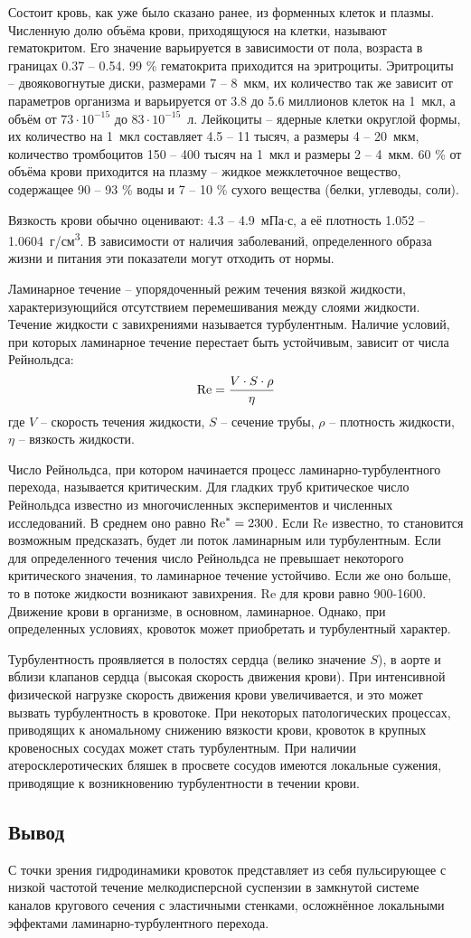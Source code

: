 Состоит кровь, как уже было сказано ранее, из форменных клеток и плазмы. Численную долю объёма крови, приходящуюся на клетки, 
называют гематокритом. Его значение варьируется в зависимости от пола, возраста в границах 0.37 -- 0.54. 99 \% гематокрита 
приходится на эритроциты. Эритроциты -- двояковогнутые диски, размерами 7 -- 8~мкм, их количество так же зависит от параметров организма 
и варьируется от 3.8 до 5.6 миллионов клеток на 1~мкл, а объём от $73\cdot10^{-15}$ до $83\cdot10^{-15}$~л. 
Лейкоциты -- ядерные клетки округлой формы, их количество на 1~мкл составляет 4.5 -- 11 тысяч, а размеры 4 -- 20~мкм, 
количество тромбоцитов 150 -- 400 тысяч на 1~мкл и размеры 2 -- 4~мкм. 60 \% от объёма крови приходится на плазму -- жидкое межклеточное 
вещество, содержащее 90 -- 93 \% воды и 7 -- 10 \% сухого вещества (белки, углеводы, соли).

Вязкость крови обычно оценивают: 4.3 -- 4.9~мПа$\cdot$с, а её плотность 1.052 -- 1.0604~г/см\textsuperscript{3}. 
В зависимости от наличия заболеваний, определенного образа жизни и питания эти показатели могут отходить от нормы. 

Ламинарное течение -- упорядоченный режим течения вязкой жидкости, характеризующийся отсутствием перемешивания между слоями жидкости. 
Течение жидкости с завихрениями называется турбулентным. 
Наличие условий, при которых ламинарное течение перестает быть устойчивым, зависит от числа Рейнольдса:
$$\mathrm{Re}=\frac{V\cdot S\cdot \rho}{\eta}$$
где $V$ -- скорость течения жидкости, $S$ -- сечение трубы, $\rho$ -- плотность жидкости, $\eta$ -- вязкость жидкости.

Число Рейнольдса, при котором начинается процесс ламинарно-турбулентного перехода, называется критическим.  Для гладких труб 
критическое число Рейнольдса известно из многочисленных экспериментов и численных исследований. В среднем оно равно $\mathrm{Re}^*=2300$.
Если Re известно, то становится возможным предсказать, будет ли поток ламинарным или турбулентным. 
Если для определенного течения число Рейнольдса не превышает некоторого критического значения, то ламинарное течение устойчиво.
Если же оно больше, то в потоке жидкости возникают завихрения. Re для крови равно 900-1600. Движение крови в организме, в основном, 
ламинарное. Однако, при определенных условиях, кровоток может приобретать и турбулентный характер.

Турбулентность проявляется в полостях сердца (велико значение $S$), в аорте и вблизи клапанов сердца (высокая скорость движения крови). 
При интенсивной физической нагрузке скорость движения крови увеличивается, и это может вызвать турбулентность в кровотоке. 
При некоторых патологических процессах, приводящих к аномальному снижению вязкости крови, кровоток в крупных кровеносных сосудах может 
стать турбулентным.  При наличии атеросклеротических бляшек в просвете сосудов имеются локальные сужения, приводящие к возникновению 
турбулентности в течении крови. 

\subsection{Вывод}
 С точки зрения гидродинамики кровоток представляет из себя пульсирующее с низкой частотой течение мелкодисперсной суспензии в 
 замкнутой системе каналов кругового сечения с эластичными стенками, осложнённое локальными эффектами ламинарно-турбулентного перехода.
